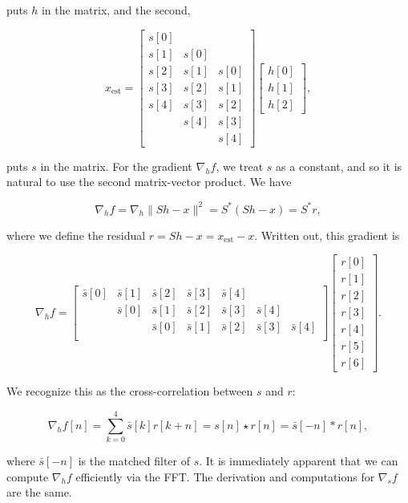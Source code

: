 \documentclass[journal]{IEEEtran}
\begin{document}
\noindent puts $h$ in the matrix, and the second,

\[ x_\text{est} = \begin{bmatrix} s[0]\\s[1]&s[0]\\s[2]&s[1]&s[0]\\s[3]&s[2]&s[1]\\s[4]&s[3]&s[2]\\&s[4]&s[3]\\&&s[4]\end{bmatrix}\begin{bmatrix}h[0]\\h[1]\\h[2]\end{bmatrix}, \] 

\noindent puts $s$ in the matrix.  For the gradient $\nabla_hf$, we treat $s$ as a constant, and so it is natural to use the second matrix-vector product.  We have

\[ \nabla_hf = \nabla_h\|Sh-x\|^2 = S^\ast(Sh-x) = S^\ast r, \] 

\noindent where we define the residual $r=Sh-x = x_\text{est}-x$.  Written out, this gradient is

\[ \nabla_h f = \begin{bmatrix} \bar{s}[0]&\bar{s}[1]&\bar{s}[2]&\bar{s}[3]&\bar{s}[4]\\&\bar{s}[0]&\bar{s}[1]&\bar{s}[2]&\bar{s}[3]&\bar{s}[4]\\&&\bar{s}[0]&\bar{s}[1]&\bar{s}[2]&\bar{s}[3]&\bar{s}[4]\\\end{bmatrix}\begin{bmatrix}r[0]\\r[1]\\r[2]\\r[3]\\r[4]\\r[5]\\r[6]\end{bmatrix}. \] 

\noindent We recognize this as the cross-correlation between $s$ and $r$:

\[ \nabla_h f[n] = \sum_{k=0}^4 \bar{s}[k]r[k+n] = s[n]\star r[n] = \bar{s}[-n]\ast r[n], \]

\noindent where $\bar{s}[-n]$ is the matched filter of $s$.  It is immediately apparent that we can compute $\nabla_hf$ efficiently via the FFT.  The derivation and computations for $\nabla_sf$ are the same.\\
\end{document}
